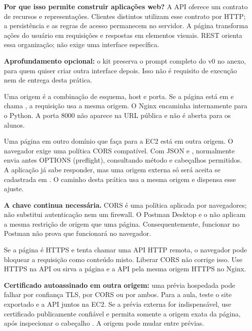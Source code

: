 \textbf{Por que isso permite construir aplicações web?} A API oferece um contrato de recursos e representações. Clientes distintos utilizam esse contrato por HTTP; a persistência e as regras de acesso permanecem no servidor. A página transforma ações do usuário em requisições e respostas em elementos visuais. REST orienta essa organização; não exige uma interface específica.

\textbf{Aprofundamento opcional:} o kit preserva o prompt completo do v0 no anexo, para quem quiser criar outra interface depois. Isso não é requisito de execução nem de entrega desta prática.

Uma origem é a combinação de esquema, host e porta. Se a página está em  e chama , a requisição usa a mesma origem. O Nginx encaminha internamente para o Python. A porta 8000 não aparece na URL pública e não é aberta para os alunos.

Uma página em outro domínio que faça  para a EC2 está em outra origem. O navegador exige uma política CORS compatível. Com JSON e , normalmente envia antes OPTIONS (preflight), consultando método e cabeçalhos permitidos. A aplicação já sabe responder, mas uma origem externa só será aceita se cadastrada em . O caminho desta prática usa a mesma origem e dispensa esse ajuste.

\textbf{A chave continua necessária.} CORS é uma política aplicada por navegadores; não substitui autenticação nem um firewall. O Postman Desktop e o  não aplicam a mesma restrição de origem que uma página. Consequentemente, funcionar no Postman não prova que funcionará no navegador.

Se a página é HTTPS e tenta chamar uma API HTTP remota, o navegador pode bloquear a requisição como conteúdo misto. Liberar CORS não corrige isso. Use HTTPS na API ou sirva a página e a API pela mesma origem HTTPS no Nginx.

\textbf{Certificado autoassinado em outra origem:} uma prévia hospedada pode falhar por confiança TLS, por CORS ou por ambos. Para a aula, teste o site exportado e a API juntos na EC2. Se a prévia externa for indispensável, use certificado publicamente confiável e permita somente a origem exata da página, após inspecionar o cabeçalho . A origem pode mudar entre prévias.

